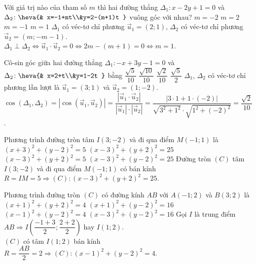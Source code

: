 \begin{ex}%
	Với giá trị nào của tham số $m$ thì hai đường thẳng $\Delta_1\colon x-2y+1=0$ và $\Delta_2\colon\heva{& x=-1+mt\\&y=2-(m+1)t }$ vuông góc với nhau?
	\choice 
	{$m=-2$} 
	{$m=2$}
	{$m=-1$} 
	{\True $m=1$}
	\loigiai
	{
		$\Delta_1$ có véc-tơ chỉ phương $\overrightarrow{u}_1=(2;1)$, $\Delta_2$ có véc-tơ chỉ phương $\overrightarrow{u}_2=(m;-m-1)$.\\
		$\Delta_1\perp\Delta_2\Leftrightarrow \overrightarrow{u}_1\cdot\overrightarrow{u}_2=0\Leftrightarrow 2m-(m+1)=0\Leftrightarrow m=1$.
	}
\end{ex}

\begin{ex}%
	Cô-sin góc giữa hai đường thẳng $\Delta_1\colon -x+3y-1=0$ và $\Delta_2\colon\heva{& x=2+t\\&y=1-2t }$ bằng
	\choice 
	{$\dfrac{\sqrt{5}}{10}$} 
	{$\dfrac{\sqrt{10}}{10}$}
	{\True $\dfrac{\sqrt{2}}{10}$} 
	{$\dfrac{\sqrt{5}}{2}$}
	\loigiai
	{
		$\Delta_1$, $\Delta_2$ có véc-tơ chỉ phương lần lượt là $\overrightarrow{u}_1=(3;1)$ và $\overrightarrow{u}_2=(1;-2)$.\\
		$\cos\left (\Delta_1,\Delta_2 \right )=\left |\cos\left (\overrightarrow{u}_1,\overrightarrow{u}_2 \right ) \right |=\dfrac{\left |\overrightarrow{u}_1\cdot\overrightarrow{u}_2 \right |}{\left |\overrightarrow{u}_1 \right |\cdot\left |\overrightarrow{u}_2 \right |}=\dfrac{\left |3\cdot 1+1\cdot (-2) \right |}{\sqrt{3^2+1^2}\cdot\sqrt{1^2+(-2)^2}}=\dfrac{\sqrt{2}}{10}$.
	}
\end{ex}

\begin{ex}%
	Phương trình đường tròn tâm $I(3;-2)$ và đi qua điểm $M(-1;1)$ là
	\choice 
	{$(x+3)^2+(y-2)^2=5$} 
	{\True $(x-3)^2+(y+2)^2=25$}
	{$(x-3)^2+(y+2)^2=5$} 
	{$(x-3)^2+(y-2)^2=25$}
	\loigiai
	{
		Đường tròn $(C)$ tâm $I(3;-2)$ và đi qua điểm $M(-1;1)$ có bán kính $R=IM=5\Rightarrow (C)\colon (x-3)^2+(y+2)^2=25$.
	}
\end{ex}

\begin{ex}%
	Phương trình đường tròn $(C)$ có đường kính $AB$ với $A(-1;2)$ và $B(3;2)$ là
	\choice 
	{$(x+1)^2+(y+2)^2=4$} 
	{$(x+1)^2+(y-2)^2=16$}
	{\True $(x-1)^2+(y-2)^2=4$} 
	{$(x-3)^2+(y-2)^2=16$}
	\loigiai
	{
		Gọi $I$ là trung điểm $AB\Rightarrow I\left (\dfrac{-1+3}{2};\dfrac{2+2}{2} \right )$ hay $I(1;2)$.\\
		$(C)$ có tâm $I(1;2)$ bán kính $R=\dfrac{AB}{2}=2\Rightarrow (C)\colon (x-1)^2+(y-2)^2=4$.
	}
\end{ex}

